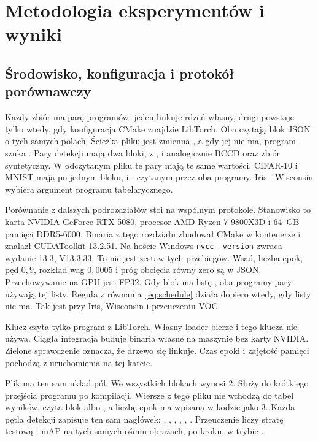 \chapter{Metodologia eksperymentów i wyniki}

\section{Środowisko, konfiguracja i protokół porównawczy}

Każdy zbiór ma parę programów: jeden linkuje rdzeń własny, drugi powstaje tylko wtedy, gdy konfiguracja CMake znajdzie LibTorch. Oba czytają blok JSON o tych samych polach. Ścieżka pliku jest zmienna , a gdy jej nie ma, program szuka . Pary detekcji mają dwa bloki,  z , i analogicznie BCCD oraz zbiór syntetyczny. W odczytanym pliku te pary mają te same wartości. CIFAR-10 i MNIST mają po jednym bloku,  i , czytanym przez oba programy. Iris i Wisconsin wybiera argument programu tabelarycznego.

Porównanie z dalszych podrozdziałów stoi na wspólnym protokole. Stanowisko to karta NVIDIA GeForce RTX 5080, procesor AMD Ryzen 7 9800X3D i 64~GB pamięci DDR5-6000. Binaria z tego rozdziału zbudował CMake w kontenerze i znalazł CUDAToolkit 13.2.51. Na hoście Windows \texttt{nvcc --version} zwraca wydanie 13.3, V13.3.33. To nie jest zestaw tych przebiegów. Wsad, liczba epok, pęd \(0{,}9\), rozkład wag \(0{,}0005\) i próg obcięcia równy zero są w JSON. Przechowywanie na GPU jest FP32. Gdy blok ma listę , oba programy pary używają tej listy. Reguła z równania~\eqref{eq:schedule} działa dopiero wtedy, gdy listy nie ma. Tak jest przy Iris, Wisconsin i przeuczeniu VOC.

Klucz  czyta tylko program z LibTorch. Własny loader bierze  i tego klucza nie używa. Ciągła integracja buduje binaria własne na maszynie bez karty NVIDIA. Zielone sprawdzenie oznacza, że drzewo się linkuje. Czas epoki i zajętość pamięci pochodzą z uruchomienia na tej karcie.

Plik  ma ten sam układ pól. We wszystkich blokach  wynosi \(2\). Służy do krótkiego przejścia programu po kompilacji. Wiersze z tego pliku nie wchodzą do tabel wyników.  czyta blok  albo , a liczbę epok ma wpisaną w kodzie jako \(3\). Każda pętla detekcji zapisuje ten sam nagłówek: , , , , , . Przeuczenie liczy stratę testową i mAP na tych samych ośmiu obrazach, po kroku, w trybie .

